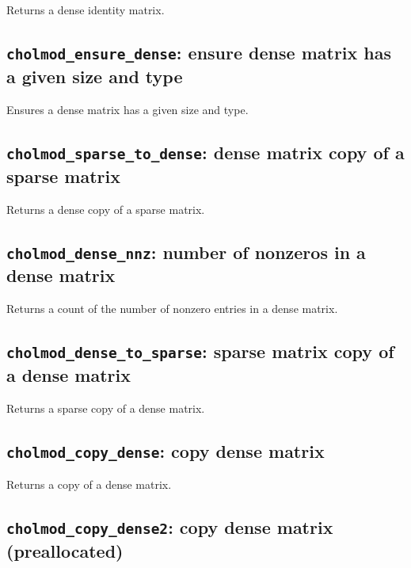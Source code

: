 \documentclass[11pt]{article}
\begin{document}

Returns a dense identity matrix.

\subsection{{\tt cholmod\_ensure\_dense}: ensure dense matrix has a given size
and type}


Ensures a dense matrix has a given size and type.

\subsection{{\tt cholmod\_sparse\_to\_dense}: dense matrix copy of a sparse matrix}


Returns a dense copy of a sparse matrix.

\subsection{{\tt cholmod\_dense\_nnz}: number of nonzeros in a dense matrix}


Returns a count of the number of nonzero entries in a dense matrix.

\subsection{{\tt cholmod\_dense\_to\_sparse}: sparse matrix copy of a dense matrix}


Returns a sparse copy of a dense matrix.

\subsection{{\tt cholmod\_copy\_dense}: copy dense matrix}


Returns a copy of a dense matrix.

\subsection{{\tt cholmod\_copy\_dense2}: copy dense matrix (preallocated)}
\end{document}
